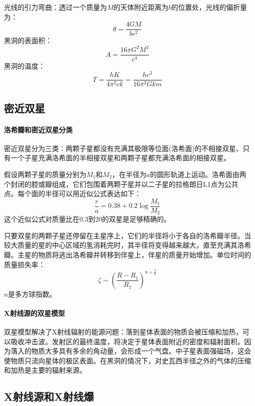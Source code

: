 光线的引力弯曲：透过一个质量为$M$的天体附近距离为$b$的位置处，光线的偏折量为：
\begin{equation}
	\theta=\frac{4GM}{bc^2}
\end{equation}
黑洞的表面积：
\begin{equation}
	A=\frac{16\pi G^2M^2}{c^4}
\end{equation}
黑洞的温度：
\begin{equation}
	T=\frac{hK}{4\pi^2ck}=\frac{hc^3}{16\pi^2Gkm}
\end{equation}
\subsection{密近双星}
\paragraph{洛希瓣和密近双星分类}
密近双星分为三类：两颗子星都没有充满其极限等位面(洛希面)的不相接双星、只有一个子星充满洛希面的半相接双星和两颗子星都充满洛希面的相接双星。

假设两颗子星的质量分别为$M_{1}$和$M_{2}$，在半径为$a$的圆形轨道上运动。洛希面由两个封闭的腔或瓣组成，它们包围着两颗子星并以二子星的拉格朗日L1点为公共点。每个面的半径可以用近似公式表达如下：
\begin{equation}
	\frac{r}{a}=0.38+0.2\log\frac{M_{1}}{M_{2}}
\end{equation}
这个近似公式对质量比在0.3到20的双星是足够精确的。

只要双星的两颗子星还停留在主星序上，它们的半径将小于各自的洛希瓣半径。当较大质量的星的中心区域的氢消耗完时，其半径将变得越来越大，直至充满其洛希瓣。主星的物质将逃出洛希瓣并转移到伴星上，伴星的质量开始增加。单位时间的质量损失率：
\begin{equation}
	\zeta\sim\left(\frac{R-R_{1}}{R_{1}}\right)^{n+\frac{3}{2}}
\end{equation}
$n$是多方球指数。
\paragraph{X射线源的双星模型}
双星模型解决了X射线辐射的能源问题：落到星体表面的物质会被压缩和加热，可以吸收冲击波。发射区的最终温度，将决定于星体表面附近的密度和辐射面积。因为落入的物质大多具有多余的角动量，会形成一个气盘。中子星表面强磁场，这会使物质只流向星体的极区表面。在黑洞的情况下，对史瓦西半径之外的气体的压缩和加热是主要的辐射来源。
\subsection{X射线源和X射线爆}
